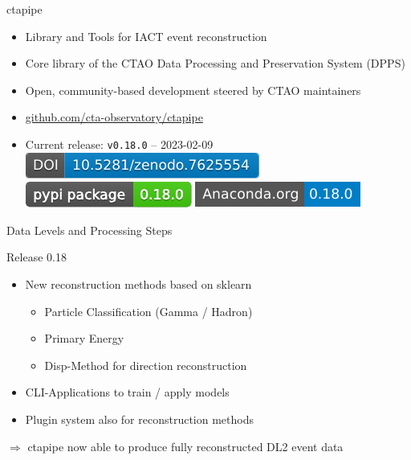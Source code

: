 \documentclass[aspectratio=1610, 9pt]{beamer}
\begin{document}
\begin{frame}{ctapipe}
  \begin{itemize}
    \item Library and Tools for IACT event reconstruction
    \item Core library of the CTAO Data Processing and Preservation System (DPPS)
    \item Open, community-based development steered by CTAO maintainers
    \item \href{https://github.com/cta-observatory/ctapipe}{github.com/cta-observatory/ctapipe}
    \item Current release: \texttt{v0.18.0} – 2023-02-09
      \href{https://doi.org/10.5281/zenodo.3372210}{\includegraphics[height=2ex]{images/ctapipe_zenodo.pdf}}
      \href{https://pypi.org/project/ctapipe}{\includegraphics[height=2ex]{images/ctapipe_pypi.pdf}}
      \href{https://anaconda.org/conda-forge/ctapipe}{\includegraphics[height=2ex]{images/ctapipe_conda.pdf}}
  \end{itemize}
\end{frame}

\begin{frame}
  
\end{frame}

\begin{frame}{Data Levels and Processing Steps}
  \vspace{-0.5cm}%
  
\end{frame}

\begin{frame}{Release 0.18}
  \begin{itemize}
    \item New reconstruction methods based on sklearn
      \begin{itemize}
        \item Particle Classification (Gamma / Hadron)
        \item Primary Energy
        \item Disp-Method for direction reconstruction
      \end{itemize}
    \item CLI-Applications to train / apply models
    \item Plugin system also for reconstruction methods
  \end{itemize}

  \bigskip
  \begin{center}
    \large
    $\Rightarrow$ ctapipe now able to produce fully reconstructed DL2 event data
  \end{center}
\end{frame}
\end{document}
